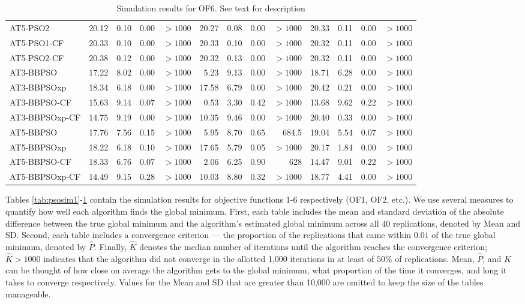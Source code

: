 \documentclass[cmbright]{staauth}
\begin{document}
\begin{table}[ht]
\begin{tabular}{l|rrrr|rrrr|rrrr}
  AT5-PSO2 & 20.12 & 0.10 & 0.00 & $> 1000$ & 20.27 & 0.08 & 0.00 & $> 1000$ & 20.33 & 0.11 & 0.00 & $> 1000$ \\
  AT5-PSO1-CF & 20.33 & 0.10 & 0.00 & $> 1000$ & 20.33 & 0.10 & 0.00 & $> 1000$ & 20.32 & 0.11 & 0.00 & $> 1000$ \\
  AT5-PSO2-CF & 20.38 & 0.12 & 0.00 & $> 1000$ & 20.32 & 0.13 & 0.00 & $> 1000$ & 20.32 & 0.11 & 0.00 & $> 1000$ \\
   \hline
AT3-BBPSO & 17.22 & 8.02 & 0.00 & $> 1000$ & 5.23 & 9.13 & 0.00 & $> 1000$ & 18.71 & 6.28 & 0.00 & $> 1000$ \\
  AT3-BBPSOxp & 18.34 & 6.18 & 0.00 & $> 1000$ & 17.58 & 6.79 & 0.00 & $> 1000$ & 20.42 & 0.21 & 0.00 & $> 1000$ \\
  AT3-BBPSO-CF & 15.63 & 9.14 & 0.07 & $> 1000$ & 0.53 & 3.30 & 0.42 & $> 1000$ & 13.68 & 9.62 & 0.22 & $> 1000$ \\
  AT3-BBPSOxp-CF & 14.75 & 9.19 & 0.00 & $> 1000$ & 10.35 & 9.46 & 0.00 & $> 1000$ & 20.40 & 0.33 & 0.00 & $> 1000$ \\
   \hline
AT5-BBPSO & 17.76 & 7.56 & 0.15 & $> 1000$ & 5.95 & 8.70 & 0.65 & 684.5 & 19.04 & 5.54 & 0.07 & $> 1000$ \\
  AT5-BBPSOxp & 18.22 & 6.18 & 0.10 & $> 1000$ & 17.65 & 5.79 & 0.05 & $> 1000$ & 20.17 & 1.84 & 0.00 & $> 1000$ \\
  AT5-BBPSO-CF & 18.33 & 6.76 & 0.07 & $> 1000$ & 2.06 & 6.25 & 0.90 & 628 & 14.47 & 9.01 & 0.22 & $> 1000$ \\
  AT5-BBPSOxp-CF & 14.49 & 9.15 & 0.28 & $> 1000$ & 10.03 & 8.80 & 0.32 & $> 1000$ & 18.77 & 4.41 & 0.00 & $> 1000$ \\
   \hline
\end{tabular}
\endgroup
\caption{Simulation results for OF6. See text for description}
\label{tab:psosim6}
\end{table}

Tables \ref{tab:psosim1}-\ref{tab:psosim6} contain the simulation results for objective functions 1-6 respectively (OF1, OF2, etc.). We use several measures to quantify how well each algorithm finds the global minimum. First, each table includes the mean and standard deviation of the absolute difference between the true global minimum and the algorithm's estimated global minimum across all 40 replications, denoted by Mean and SD. Second, each table includes a convergence criterion --- the proportion of the replications that came within $0.01$ of the true global minimum, denoted by $\widehat{P}$. Finally, $\widehat{K}$ denotes the median number of iterations until the algorithm reaches the convergence criterion; $\widehat{K} > 1000$ indicates that the algorithm did not converge in the allotted 1,000 iterations in at least of $50\%$ of replications. Mean, $\widehat{P}$, and $\widehat{K}$ can be thought of how close on average the algorithm gets to the global minimum, what proportion of the time it converges, and long it takes to converge respectively. Values for the Mean and SD that are greater than 10,000 are omitted to keep the size of the tables manageable.
\end{document}
